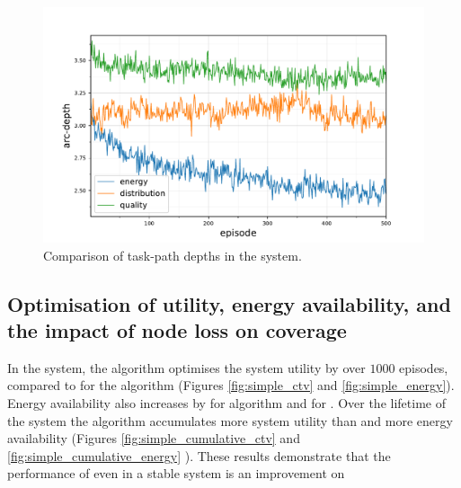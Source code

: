 \begin{figure}[ht]
	\begin{minipage}{.49\textwidth}
		\centering
		\includegraphics[width=1.0\linewidth,trim={25pt 0pt 50pt 0pt},clip]{5.19_ctv-arc-depth-comparison}
		\caption{Comparison of task-path depths  in the \simulationExtended{}{} system.}
		\label{fig:extended_arc_depth}
	\end{minipage}\hfill%
\begin{minipage}{.49\textwidth}
\end{minipage}
\end{figure}

\subsection{Optimisation of utility, energy availability, and the  impact of node loss on coverage}
In the \simulationSimple{}{} system, the \acronymWSNOptimisation{}{} algorithm optimises the system utility by \resultsSimpleCTVBalancedDiff{}{} over $1000$ episodes, compared to \resultsSimpleCTVQRoutingDiff{}{} for the \algorithmQRouting{}{} algorithm (Figures \ref{fig:simple_ctv} and \ref{fig:simple_energy}). Energy availability also increases by \resultsSimpleEnergyBalancedDiff{}{} for \algorithmBalanced{}{} algorithm and \resultsSimpleEnergyQRoutingDiff{}{} for \algorithmQRouting{}{}. Over the lifetime of the system the \algorithmBalanced{}{} algorithm accumulates \resultsSimpleCumulativeCTVComparison{}{} more system utility than \algorithmQRouting{}{} and \resultsSimpleCumulativeEnergyComparison{}{} more energy availability (Figures \ref{fig:simple_cumulative_ctv} and \ref{fig:simple_cumulative_energy} ). These results demonstrate that the performance of \acronymWSNOptimisation{}{} even in a stable system is an improvement on \acronymQRouting{}{}

